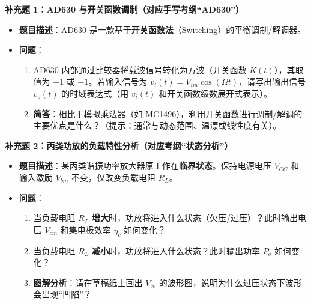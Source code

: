\documentclass[a4paper,12pt]{ctexart}
\begin{document}
	\textbf{补充题 1：AD630 与开关函数调制（对应手写考纲“AD630”）}
	\begin{itemize}
		\item \textbf{题目描述}：AD630 是一款基于\textbf{开关函数法}（Switching）的平衡调制/解调器。
		\item \textbf{问题}：
		\begin{enumerate}
			\item AD630 内部通过比较器将载波信号转化为方波（开关函数 $K(t)$），其取值为 $+1$ 或 $-1$。若输入信号为 $v_i(t) = V_{im}\cos(\Omega t)$，请写出输出信号 $v_o(t)$ 的时域表达式（用 $v_i(t)$ 和开关函数级数展开式表示）。
			\item \textbf{简答}：相比于模拟乘法器（如 MC1496），利用开关函数进行调制/解调的主要优点是什么？（提示：通常与动态范围、温漂或线性度有关）。
		\end{enumerate}
	\end{itemize}

	\newpage
	\textbf{补充题 2：丙类功放的负载特性分析（对应考纲“状态分析”）}
	\begin{itemize}
		\item \textbf{题目描述}：某丙类谐振功率放大器原工作在\textbf{临界状态}。保持电源电压 $V_{CC}$ 和输入激励 $V_{bm}$ 不变，仅改变负载电阻 $R_L$。
		\item \textbf{问题}：
		\begin{enumerate}
			\item 当负载电阻 $R_L$ \textbf{增大}时，功放将进入什么状态（欠压/过压）？此时输出电压 $V_{cm}$ 和集电极效率 $\eta_c$ 如何变化？
			\item 当负载电阻 $R_L$ \textbf{减小}时，功放将进入什么状态？此时输出功率 $P_o$ 如何变化？
			\item \textbf{图解分析}：请在草稿纸上画出 $V_{ce}$ 的波形图，说明为什么过压状态下波形会出现“凹陷”？
		\end{enumerate}
	\end{itemize}

	\newpage
\end{document}
